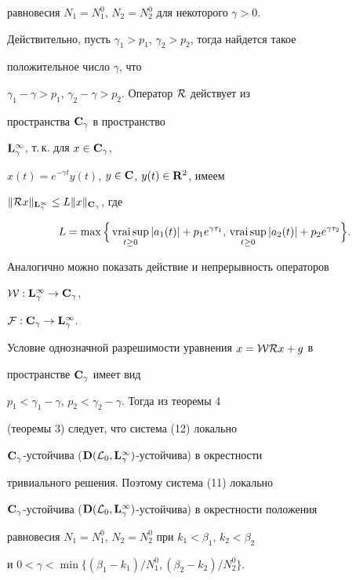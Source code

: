 \begin{exam}
равновесия $N_1=N_1^0$, $N_2=N_2^0$ для некоторого $\gamma>0$.





Действительно, пусть $\gamma_1>p_1$, $\gamma_2>p_2$, тогда найдется такое


положительное число $\gamma$, что


$\gamma_1-\gamma>p_1$, $\gamma_2-\gamma>p_2$. Оператор $\cal R$ действует из


пространства $\bold {C}_\gamma$ в пространство


$\bold {L}^{\infty}_\gamma$, т.\,к. для $x\in\bold {C}_\gamma$,


$x(t)=e^{-\gamma t}y(t)$, $y\in\bold {C}$, $y(t)\in \bold {R}^2$, имеем


$\|{\cal R}x\|_{\bold{L}^{\infty}_\gamma}\le


L\|x\|_{\bold{C}_\gamma}$, где


$$


L=\max\Big\{\vraisup_{t\ge0}|a_1(t)|+p_1e^{\gamma\tau_1},\,


\vraisup_{t\ge0}|a_2(t)|+p_2e^{\gamma\tau_2}\Big\}.


$$


Аналогично можно показать действие и непрерывность операторов


${\cal W}:\bold {L}^{\infty}_\gamma\to\bold {C}_\gamma$,


${\cal F}:\bold {C}_\gamma\to\bold {L}^{\infty}_\gamma$.


Условие однозначной разрешимости уравнения $x={\cal W}{\cal R}x+g$ в


пространстве $\bold {C}_\gamma$ имеет вид


$p_1<\gamma_1-\gamma$, $p_2<\gamma_2-\gamma$. Тогда из теоремы 4


(теоремы 3) следует, что система (12) локально


$\spc{C}_\gamma$-устойчива ($\spc{D}({\cal


L}_0, \spc{L}^{\infty}_\gamma)$-устойчива) в окрестности


тривиального решения. Поэтому система (11) локально


$\spc{C}_\gamma$-устойчива ($\spc{D}({\cal L}_0,


\spc{L}^{\infty}_\gamma)$-устойчива) в окрестности положения


равновесия $N_1=N_1^0$, $N_2=N_2^0$ при $k_1<\beta_1$, $k_2<\beta_2$


и $0<\gamma<\min\{(\beta_1-k_1)/N_1^0, (\beta_2-k_2)/N_2^0\}$.


\end{exam}





